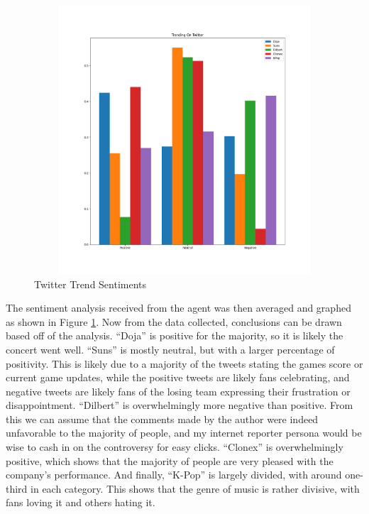 \documentclass[]{article}
\begin{document}
    \begin{figure}
        \includegraphics[width=12cm, height=10cm]{trending_on_twitter.png}
        \caption{Twitter Trend Sentiments}
        \label{fig:graph}
    \end{figure}

    The sentiment analysis received from the agent was then averaged and graphed as shown in Figure \ref{fig:graph}.
    Now from the data collected, conclusions can be drawn based off of the analysis. ``Doja'' is positive for the 
    majority, so it is likely the concert went well. ``Suns'' is mostly neutral, but with a larger percentage
    of positivity. This is likely due to a majority of the tweets stating the games score or current game updates, 
    while the positive tweets are likely fans celebrating, and negative tweets are likely fans of the losing team
    expressing their frustration or disappointment. ``Dilbert'' is overwhelmingly more negative than positive. From
    this we can assume that the comments made by the author were indeed unfavorable to the majority of people, and 
    my internet reporter persona would be wise to cash in on the controversy for easy clicks. ``Clonex'' is 
    overwhelmingly positive, which shows that the majority of people are very pleased with the company's performance.
    And finally, ``K-Pop'' is largely divided, with around one-third in each category. This shows that the genre
    of music is rather divisive, with fans loving it and others hating it.
\end{document}
